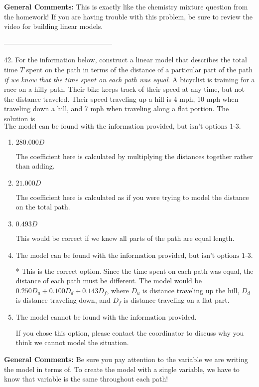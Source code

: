 \documentclass{extbook}[14pt]
\begin{document}
\textbf{General Comments:} This is exactly like the chemistry mixture question from the homework! If you are having trouble with this problem, be sure to review the video for building linear models.

-----------------------------------------------

42. For the information below, construct a linear model that describes the total time $T$ spent on the path in terms of the distance of a particular part of the path \textit{if we know that the time spent on each path was equal}.
A bicyclist is training for a race on a hilly path. Their bike keeps track of their speed at any time, but not the distance traveled. Their speed traveling up a hill is 4 mph, 10 mph when traveling down a hill, and 7 mph when traveling along a flat portion. 
The solution is $ \text{The model can be found with the information provided, but isn't options 1-3.} $ 

\begin{enumerate}[label=\Alph*.] 
\item $ 280.000 D $ 

 The coefficient here is calculated by multiplying the distances together rather than adding. 
\item $ 21.000 D $ 

 The coefficient here is calculated as if you were trying to model the distance on the total path. 
\item $ 0.493 D $ 

 This would be correct if we knew all parts of the path are equal length. 
\item $ \text{The model can be found with the information provided, but isn't options 1-3.} $ 

 * This is the correct option. Since the time spent on each path was equal, the distance of each path must be different. The model would be $0.250D_u + 0.100D_d + 0.143D_f$, where $D_u$ is distance traveling up the hill, $D_d$ is distance traveling down, and $D_f$ is distance traveling on a flat part. 
\item $ \text{The model cannot be found with the information provided.} $ 

 If you chose this option, please contact the coordinator to discuss why you think we cannot model the situation. 
\end{enumerate} 
 
\textbf{General Comments:} Be sure you pay attention to the variable we are writing the model in terms of. To create the model with a single variable, we have to know that variable is the same throughout each path!
\end{document}

